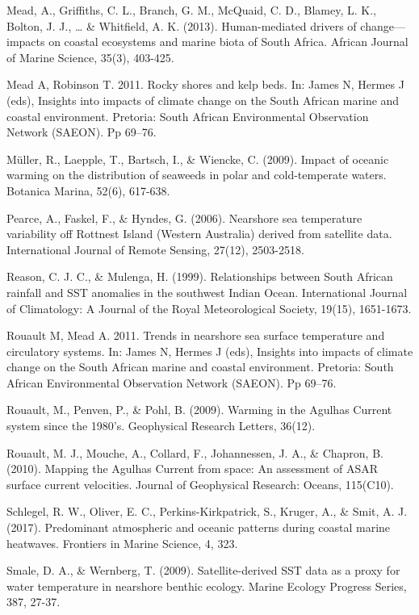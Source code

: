 \documentclass[12pt,]{article}
\begin{document}
Mead, A., Griffiths, C. L., Branch, G. M., McQuaid, C. D., Blamey, L.
K., Bolton, J. J., \ldots{} \& Whitfield, A. K. (2013). Human-mediated
drivers of change---impacts on coastal ecosystems and marine biota of
South Africa. African Journal of Marine Science, 35(3), 403-425.

Mead A, Robinson T. 2011. Rocky shores and kelp beds. In: James N,
Hermes J (eds), Insights into impacts of climate change on the South
African marine and coastal environment. Pretoria: South African
Environmental Observation Network (SAEON). Pp 69--76.

Müller, R., Laepple, T., Bartsch, I., \& Wiencke, C. (2009). Impact of
oceanic warming on the distribution of seaweeds in polar and
cold-temperate waters. Botanica Marina, 52(6), 617-638.

Pearce, A., Faskel, F., \& Hyndes, G. (2006). Nearshore sea temperature
variability off Rottnest Island (Western Australia) derived from
satellite data. International Journal of Remote Sensing, 27(12),
2503-2518.

Reason, C. J. C., \& Mulenga, H. (1999). Relationships between South
African rainfall and SST anomalies in the southwest Indian Ocean.
International Journal of Climatology: A Journal of the Royal
Meteorological Society, 19(15), 1651-1673.

Rouault M, Mead A. 2011. Trends in nearshore sea surface temperature and
circulatory systems. In: James N, Hermes J (eds), Insights into impacts
of climate change on the South African marine and coastal environment.
Pretoria: South African Environmental Observation Network (SAEON). Pp
69--76.

Rouault, M., Penven, P., \& Pohl, B. (2009). Warming in the Agulhas
Current system since the 1980's. Geophysical Research Letters, 36(12).

Rouault, M. J., Mouche, A., Collard, F., Johannessen, J. A., \& Chapron,
B. (2010). Mapping the Agulhas Current from space: An assessment of ASAR
surface current velocities. Journal of Geophysical Research: Oceans,
115(C10).

Schlegel, R. W., Oliver, E. C., Perkins-Kirkpatrick, S., Kruger, A., \&
Smit, A. J. (2017). Predominant atmospheric and oceanic patterns during
coastal marine heatwaves. Frontiers in Marine Science, 4, 323.

Smale, D. A., \& Wernberg, T. (2009). Satellite-derived SST data as a
proxy for water temperature in nearshore benthic ecology. Marine Ecology
Progress Series, 387, 27-37.
\end{document}
